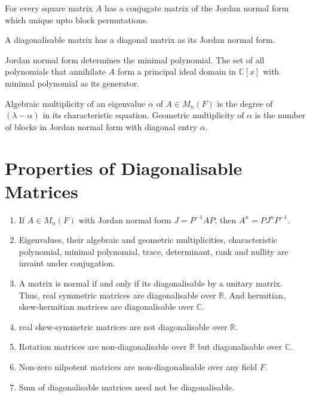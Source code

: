 \begin{note}
	For every square matrix $A$ has a conjugate matrix of the Jordan normal form which unique upto block permutations.
\end{note}

\begin{definition}[diagonalisable]
	A diagonalisable matrix has a diagonal matrix as its Jordan normal form.
\end{definition}

\begin{note}
	Jordan normal form determines the minimal polynomial.
	The set of all polynomials that annihilate $A$ form a principal ideal domain in $\mathbb{C}[x]$ with minimal polynomial as its generator.
\end{note}

\begin{definition}[multiplicity]
	Algebraic multiplicity of an eigenvalue $\alpha$ of $A \in M_n(F)$ is the degree of $(\lambda-\alpha)$ in its characteristic equation.
	Geometric multiplicity of $\alpha$ is the number of blocks in Jordan normal form with diagonal entry $\alpha$.
\end{definition}

\section{Properties of Diagonalisable Matrices}
\begin{enumerate}
	\item If $A \in M_n(F)$ with Jordan normal form $J = P^{-1}AP$, then $A^n = PJ^nP^{-1}$.
	\item Eigenvalues, their algebraic and geometric multiplicities, characteristic polynomial, minimal polynomial, trace, determinant, rank and nullity are invaint under conjugation.
	\item A matrix is normal if and only if its diagonalisable by a unitary matrix.
		Thus, real symmetric matrices are diagonalisable over $\mathbb{R}$.
		And hermitian, skew-hermitian matrices are diagonalisable over $\mathbb{C}$.
	\item real skew-symmetric matrices are not diagonalisable over $\mathbb{R}$.
	\item Rotation matrices are non-diagonalisable over $\mathbb{R}$ but diagonalisable over $\mathbb{C}$.
	\item Non-zero nilpotent matrices are non-diagonalisable over any field $F$.
	\item Sum of diagonalisable matrices need not be diagonalisable.
\end{enumerate}

